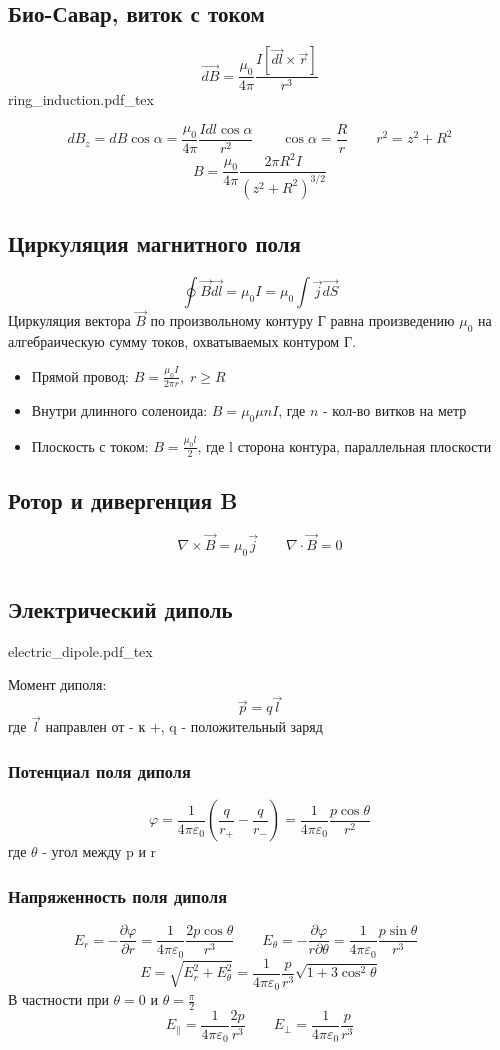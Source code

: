 \documentclass{article}
\newcommand{\incfig}[2][1]{%
    \def\svgwidth{#1\columnwidth}
    {#2.pdf_tex}
}
\begin{document}
\subsection{Био-Савар, виток с током}
\[\vec{dB}=\frac{\mu_{0}}{4\pi}\frac{I[\vec{dl}\times\vec{r}]}{r^3}\]
\incfig{ring_induction}
\[dB_z=dB\cos\alpha=\frac{\mu_0}{4\pi}\frac{Idl\cos\alpha}{r^2} \qquad \cos \alpha = \frac{R}{r} \qquad r^2=z^2+R^2\]
\[B=\frac{\mu_{0}}{4\pi}\frac{2\pi R^2 I}{(z^2+R^2)^{3/2}}\]
\subsection{Циркуляция магнитного поля}
\[\oint\vec{B}\vec{dl}=\mu_{0}I=\mu_{0}\int \vec{j}\vec{dS}\]
Циркуляция вектора $\vec{B}$ по произвольному контуру Г равна произведению $\mu_{0}$ на алгебраическую сумму токов, охватываемых контуром Г.
\begin{itemize}
    \item Прямой провод: $B=\frac{\mu_{0}I}{2\pi r}, \; r \ge R$
    \item Внутри длинного соленоида: $B=\mu_{0}\mu nI$, где $n$ - кол-во витков на метр
    \item Плоскость с током: $B=\frac{\mu_{0}l}{2}$, где l сторона контура, параллельная плоскости
\end{itemize}
\subsection{Ротор и дивергенция B}
\[\nabla \times \vec{B}=\mu_{0}\vec{j} \qquad \nabla\cdot\vec{B}=0\]


\section{}
\subsection{Электрический диполь}
\incfig{electric_dipole}
Момент диполя:
\[\vec{p}=q\vec{l}\]
где $\vec{l}$ направлен от - к +, q - положительный заряд
\subsubsection{Потенциал поля диполя}
\[
    \varphi=\frac{1}{4\pi\varepsilon_{0}}(\frac{q}{r_{+}}-\frac{q}{r_{-}})=
    \frac{1}{4\pi\varepsilon_{0}}\frac{p\cos\theta}{r^2}
\]
где $\theta$ - угол между p и r
\subsubsection{Напряженность поля диполя}
\[
    E_{r}=-\frac{\partial\varphi}{\partial r}=\frac{1}{4\pi\varepsilon_{0}}\frac{2p\cos\theta}{r^3} \qquad
    E_{\theta}=-\frac{\partial\varphi}{r\partial\theta}=\frac{1}{4\pi\varepsilon_{0}}\frac{p\sin\theta}{r^3} \qquad
\]
\[E=\sqrt{E_{r}^2+E_{\theta}^2}=\frac{1}{4\pi\varepsilon_{0}}\frac{p}{r^3}\sqrt{1+3\cos^2\theta}\]
В частности при $\theta = 0$ и $\theta = \frac{\pi}{2}$
\[
    E_{\parallel} = \frac{1}{4\pi\varepsilon_{0}}\frac{2p}{r^3} \qquad
    E_{\perp} = \frac{1}{4\pi\varepsilon_{0}}\frac{p}{r^3}
\]
\end{document}
